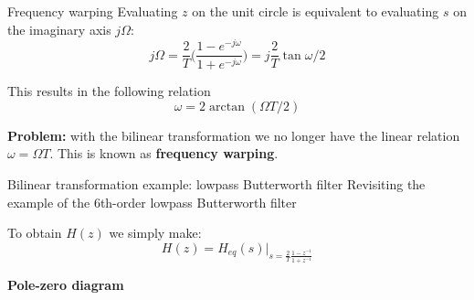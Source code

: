 \documentclass[10pt]{beamer}
\begin{document}
\begin{frame}{Frequency warping}
	Evaluating $z$ on the unit circle is equivalent to evaluating $s$ on the imaginary axis $j\Omega$:
	\begin{equation*}
j\Omega = \frac{2}{T}\bigg(\frac{1 - e^{-j\omega}}{1 + e^{-j\omega}}\bigg) = j\frac{2}{T}\tan\omega/2
\end{equation*}

This results in the following relation
\begin{equation*}
	\omega =2\arctan(\Omega T/2) \tag{frequency warping}
\end{equation*}

\textbf{Problem:} with the bilinear transformation we no longer have the linear relation $\omega = \Omega T$. This is known as \textbf{frequency warping}.

\begin{center}
	\resizebox{0.5\linewidth}{!}{}
\end{center}
\end{frame}

%
\begin{frame}{Bilinear transformation example: lowpass Butterworth filter}
Revisiting the example of the 6th-order lowpass Butterworth filter

To obtain $H(z)$ we simply make:
\begin{equation*}
H(z) = H_{eq}(s)\bigg|_{\displaystyle s = \frac{2}{T}\frac{1 - z^{-1}}{1 + z^{-1}}}
\end{equation*}

\textbf{Pole-zero diagram}
\begin{center}
	\resizebox{0.6\linewidth}{!}{}
\end{center}

\end{frame}
\end{document}
